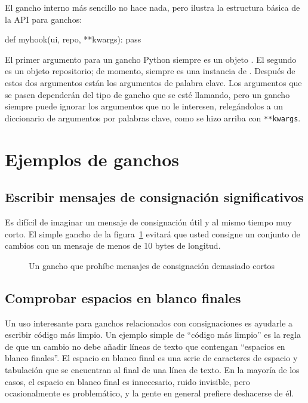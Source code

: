 El gancho interno más sencillo no hace nada, pero ilustra la
estructura básica de la API para ganchos:
\begin{codesample2}
  def myhook(ui, repo, **kwargs):
      pass
\end{codesample2}
El primer argumento para un gancho Python siempre es un objeto
.  El segundo es un objeto repositorio;
de momento, siempre es una instancia de 
.  Después de estos
dos argumentos están los argumentos de palabra clave. Los argumentos
que se pasen dependerán del tipo de gancho que se esté llamando, pero
un gancho siempre puede ignorar los argumentos que no le interesen,
relegándolos a un diccionario de argumentos por palabras clave, como se
hizo arriba con \texttt{**kwargs}.

\section{Ejemplos de ganchos}

\subsection{Escribir mensajes de consignación significativos}

Es difícil de imaginar un mensaje de consignación útil y al mismo
tiempo muy corto. El simple gancho  de la
figura~\ref{ex:hook:msglen.go} evitará que usted consigne un conjunto
de cambios con un mensaje de menos de 10 bytes de longitud.

\begin{figure}[ht]
  \caption{Un gancho que prohíbe mensajes de consignación demasiado
  cortos}
  \label{ex:hook:msglen.go}
\end{figure}

\subsection{Comprobar espacios en blanco finales}

Un uso interesante para ganchos relacionados con consignaciones es
ayudarle a escribir código más limpio. Un ejemplo simple de
``código más limpio'' es la regla de que un cambio no debe añadir
líneas de texto que contengan ``espacios en blanco finales''. El
espacio en blanco final es una serie de caracteres de espacio y
tabulación que se encuentran al final de una línea de texto. En la
mayoría de los casos, el espacio en blanco final es innecesario, ruido
invisible, pero ocasionalmente es problemático, y la gente en general
prefiere deshacerse de él.

